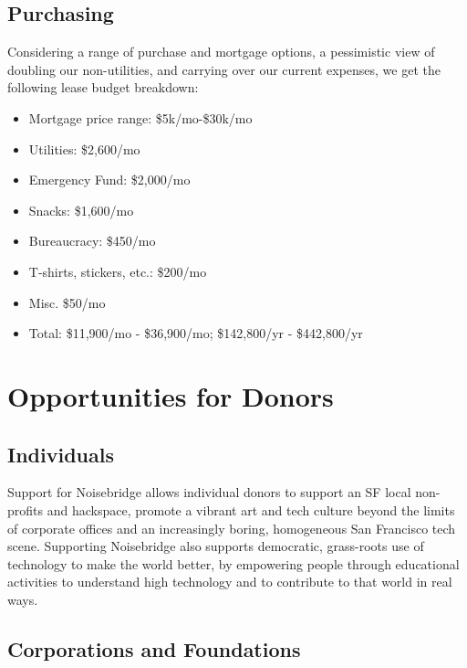 \documentclass[12pt]{article}
\begin{document}
\subsection{Purchasing}



Considering a range of purchase and mortgage options, a pessimistic view of doubling our non-utilities, and carrying over our current expenses, we get the following lease budget breakdown:

\begin{itemize}
    \item Mortgage price range: \$5k/mo-\$30k/mo
    \item Utilities: \$2,600/mo
    \item Emergency Fund: \$2,000/mo
    \item Snacks: \$1,600/mo
    \item Bureaucracy: \$450/mo
    \item T-shirts, stickers, etc.: \$200/mo
    \item Misc. \$50/mo
    \item Total: \$11,900/mo - \$36,900/mo;  \$142,800/yr - \$442,800/yr
\end{itemize}






\section{Opportunities for Donors}


\subsection{Individuals}

Support for Noisebridge allows individual donors to support an SF local non-profits and hackspace, promote a vibrant art and tech culture beyond the limits of corporate offices and an increasingly boring, homogeneous San Francisco tech scene. Supporting Noisebridge also supports democratic, grass-roots use of technology to make the world better, by empowering people through educational activities to understand high technology and to contribute to that world in real ways.



\subsection{Corporations and Foundations}
\end{document}
